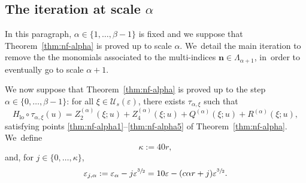 \documentclass[10pt,a4paper]{amsart}
\theoremstyle{plain}
\theoremstyle{definition}
\DeclareMathOperator{\lo}{lo}
\newcommand{\nb}{{\boldsymbol n}}
\newcommand{\1}{\mathbf{1}}
\let\epsilon\varepsilon
\begin{document}
\subsection{The iteration at scale $\alpha$}\label{sec:it-j} In this paragraph, $\alpha\in\{1,\dots,\beta-1\}$ is fixed and we suppose that Theorem~\ref{thm:nf-alpha} is proved up to scale $\alpha$. We~detail the main iteration to remove the the monomials associated to the multi-indices $\nb\in\Lambda_{\alpha+1}$, in~order to eventually go to scale $\alpha+1$.

We now suppose that Theorem~\ref{thm:nf-alpha} is proved up to the step $\alpha\in\{0,\dots,\beta-1\}$: for all $\xi\in\mathcal{U}_{s}(\epsilon)$, there exists $\tau_{\alpha,\xi}$ such that\vspace*{-3pt}
\begin{equation}
\label{eq:19h}
H_{\lo}\circ\tau_{\alpha,\xi}(u) = Z_{2}^{(\alpha)}(\xi;u) + Z_{4}^{(\alpha)}(\xi;u)+Q^{(\alpha)}(\xi;u) + R^{(\alpha)}(\xi;u),
\end{equation}
satisfying points \eqref{thm:nf-alpha1}--\eqref{thm:nf-alpha5} of Theorem~\ref{thm:nf-alpha}. We~define\vspace*{-3pt}
\[
\kappa:=40r,
\]
and, for $j\in\{0,\dots,\kappa\}$,\vspace*{-3pt}
\[
\epsilon_{j,\alpha}:=\epsilon_{\alpha}-j\epsilon^{\sfrac{3}{2}} = 10\epsilon - (c\alpha r +j)\epsilon^{\sfrac{3}{2}}.
\]
\end{document}
